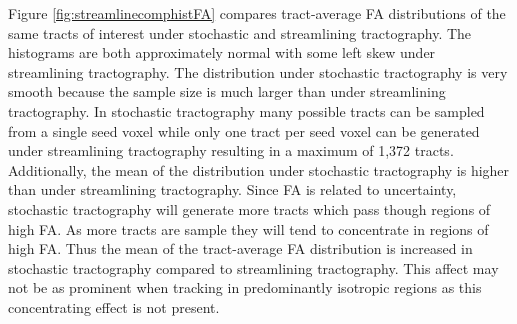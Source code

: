 Figure \ref{fig:streamlinecomphistFA} compares tract-average FA distributions of the same tracts of interest under stochastic and streamlining tractography.  The histograms are both approximately normal with some left skew under streamlining tractography.  The distribution under stochastic tractography is very smooth because the sample size is much larger than under streamlining tractography.   In stochastic tractography many possible tracts can be sampled from a single seed voxel while only one tract per seed voxel can be generated under streamlining tractography resulting in a maximum of 1,372 tracts.  Additionally, the mean of the distribution under stochastic tractography is higher than under streamlining tractography.  Since FA is related to uncertainty, stochastic tractography will generate more tracts which pass though regions of high FA.  As more tracts are sample they will tend to concentrate in regions of high FA.  Thus the mean of the tract-average FA distribution is increased in stochastic tractography compared to streamlining tractography.  This affect may not be as prominent when tracking in predominantly isotropic regions as this concentrating effect is not present.

